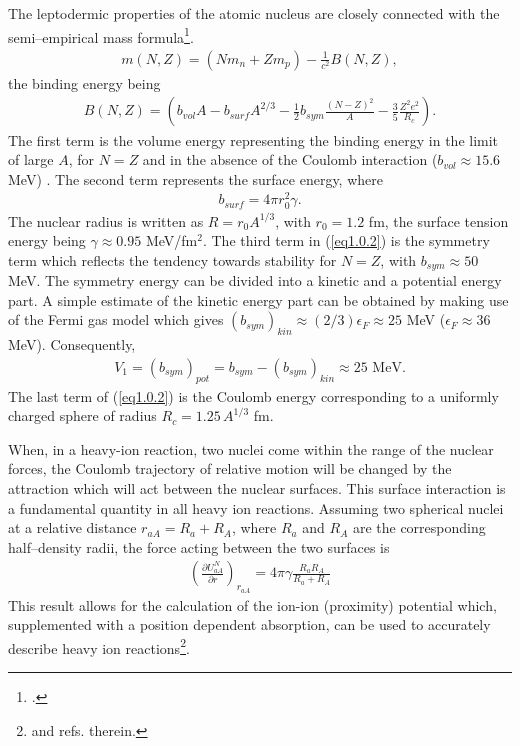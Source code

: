 The leptodermic properties of the atomic nucleus are closely connected with the semi--empirical mass formula\footnote{\cite{Weizsacker:35}.}.
\begin{align}
m(N,Z)=(Nm_n+Zm_p)-\frac{1}{c^2}B(N,Z),
\end{align}
the binding energy being
\begin{align}\label{eq1.0.2}
B(N,Z)=\left(b_{vol}A-b_{surf}A^{2/3}-\frac{1}{2} b_{sym}\frac{(N-Z)^2}{A}-\frac{3}{5}\frac{Z^2e^2}{R_c}\right).
\end{align}
The first term is the volume energy representing the binding energy in the limit of large $A$, for $N=Z$ and in the absence of the Coulomb interaction ($b_{vol}\approx15.6$ MeV) . The second term represents the surface energy, where
\begin{align}\label{eq1.0.3}
b_{surf}=4\pi r_0^2\gamma.
\end{align}
The nuclear radius is written as $R=r_0A^{1/3}$, with $r_0=1.2$ fm, the surface tension energy being $\gamma\approx 0.95$ MeV/fm$^2$. 
The third term in (\ref{eq1.0.2}) is the symmetry term which reflects the tendency towards stability for $N=Z$, with $b_{sym}\approx50$ MeV. The symmetry energy can be divided into a kinetic and a potential energy part. A simple estimate of the kinetic energy part can be obtained by making use of the Fermi gas model which gives $(b_{sym})_{kin}\approx(2/3)\epsilon_F\approx25$ MeV ($\epsilon_F\approx 36$ MeV). Consequently,
\begin{align}\label{eq1.0.4bis}
V_1=(b_{sym})_{pot}=b_{sym}-(b_{sym})_{kin}\approx 25\text{ MeV}.
\end{align}
The last term of (\ref{eq1.0.2}) is the Coulomb energy corresponding to a uniformly charged sphere of radius $R_c=1.25\,A^{1/3}$ fm.


When, in a heavy-ion reaction,  two nuclei come within the range of the nuclear forces, the Coulomb  trajectory of relative motion will be changed by the attraction which will act between the nuclear surfaces. This surface interaction is a fundamental quantity in all heavy ion reactions. Assuming two spherical nuclei at a relative distance $r_{aA}=R_a+R_A$, where $R_a$ and $R_A$ are the corresponding half--density radii, the force acting between the two surfaces is
\begin{align}\label{eq1.0.4}
\left(\frac{\partial U_{aA}^N}{\partial r}\right)_{r_{aA}}=4\pi \gamma\frac{R_aR_A}{R_a+R_A}
\end{align}
This result allows for the calculation of the ion-ion (proximity) potential which, supplemented with a position dependent absorption, can be used to accurately describe heavy ion reactions\footnote{\cite{Broglia:04a} and refs. therein.}.


